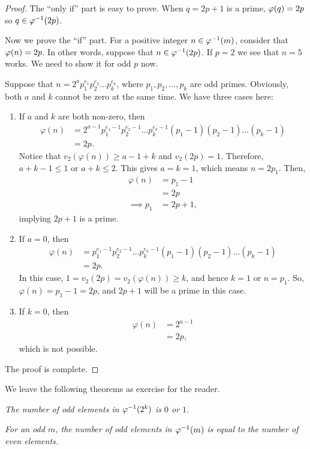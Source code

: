 \documentclass{subfile}
\begin{document}
		\begin{proof}
			The ``only if'' part is easy to prove. When $q=2p+1$ is a prime, $\varphi (q)=2p$ so $q\in\varphi ^{-1}(2p)$.
			
			Now we prove the ``if'' part. For a positive integer $n\in\varphi ^{-1}(m)$, consider that $\varphi(n)=2p$. In other words, suppose that $n \in\varphi ^{-1}(2p)$.  If $p=2$ we see that $n=5$ works. We need to show it for odd $p$ now.
			
			Suppose that $n= 2^a p_1^{e_1}p_2^{e_2}\dots p_k^{e_k}$, where $p_1, p_2, \dots, p_k$ are odd primes. Obviously, both $a$ and $k$ cannot be zero at the same time. We have three cases here:
			
				\begin{enumerate}
					\item If $a$ and $k$ are both non-zero, then
						\begin{align*}
							\varphi(n) &= 2^{a-1} p_1^{e_1-1}p_2^{e_2-1}\dots p_k^{e_k-1} (p_1-1)(p_2-1)\dots (p_k-1)\\
									   &= 2p.
						\end{align*}
					Notice that $v_2(\varphi(n)) \geq a-1+k$ and $v_2(2p)=1$. Therefore, $a+k-1 \leq 1$ or $a+k \leq 2$. This gives $a=k=1$, which means $n=2p_1$. Then,
						\begin{align*}
							\varphi(n)   &= p_1-1\\
									     &= 2p\\
							\implies p_1 &= 2p+1,
						\end{align*}
					implying $2p+1$ is a prime.
					
					\item If $a=0$, then
						\begin{align*}
							\varphi(n) &= p_1^{e_1-1}p_2^{e_2-1}\dots p_k^{e_k-1} (p_1-1)(p_2-1)\dots (p_k-1)\\
									   &= 2p.
						\end{align*}
					In this case, $1 = v_2(2p) = v_2(\varphi(n)) \geq k$, and hence $k=1$ or $n=p_1$. So, $\varphi(n)=p_1-1=2p$, and $2p+1$ will be a prime in this case.
					
					\item If $k=0$, then
						\begin{align*}
							\varphi(n) &= 2^{a-1}\\
									   &= 2p,
						\end{align*}
					which is not possible.
				\end{enumerate}
			The proof is complete.
		\end{proof}
	
	We leave the following theorems as exercise for the reader.
		\begin{theorem}\slshape
			The number of odd elements in $\varphi ^{-1}(2^k)$ is $0$ or $1$.
		\end{theorem}
		
		\begin{theorem}\slshape
			For an odd $m$, the number of odd elements in $\varphi ^{-1}(m)$ is equal to the number of even elements.
		\end{theorem}
	
\end{document}
